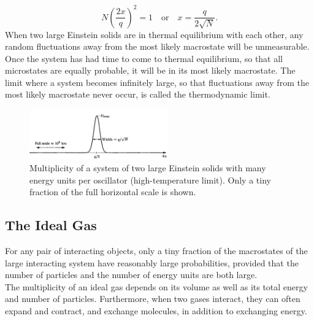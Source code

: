 \documentclass[11pt]{exam}
\begin{document}
\begin{equation}
N\left(\frac{2x}{q}\right)^2 =1\quad\text{or}\quad x=\frac{q}{2\sqrt{N}}.  
\end{equation}
\hspace*{10mm}When two large Einstein solids are in thermal equilibrium with each other, any random fluctuations away from the most likely macrostate will be unmeasurable. Once the system has had time to come to thermal equilibrium, so that all microstates are equally probable, it will be in its most likely macrostate. The limit where a system becomes infinitely large, so that fluctuations away from the most likely macrostate never occur, is called the thermodynamic limit. 
\newpage
\begin{figure}[htp]
    \centering
    \includegraphics[width=6cm]{figure13.png}
    \caption{Multiplicity of a system of two large Einstein solids with many energy units per oscillator (high-temperature limit). Only a tiny fraction of the full horizontal scale is shown.}
\label{fig:two-einstein-multiplicity}
\end{figure}
\newpage 
\subsection{The Ideal Gas}
For any pair of interacting objects, only a tiny fraction of the macrostates of the large interacting system have reasonably large probabilities, provided that the number of particles and the number of energy units are both large.\\
\hspace*{10mm}The multiplicity of an ideal gas depends on its volume as well as its total energy and number of particles. Furthermore, when two gases interact, they can often expand and contract, and exchange molecules, in addition to exchanging energy.
\newpage
\end{document}
